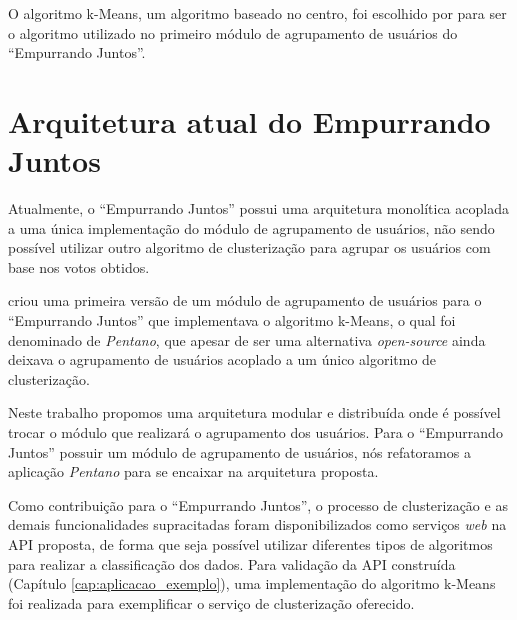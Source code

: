   O algoritmo k-Means, um algoritmo baseado no centro, foi escolhido por  
  para ser o algoritmo utilizado no primeiro módulo de agrupamento de usuários do ``Empurrando Juntos''.
  
\section{Arquitetura atual do Empurrando Juntos}
  
  Atualmente, o ``Empurrando Juntos'' possui uma arquitetura monolítica acoplada a uma única implementação
  do módulo de agrupamento de usuários, não sendo possível utilizar outro algoritmo de clusterização para
  agrupar os usuários com base nos votos obtidos.
  
   criou uma primeira versão de um módulo de agrupamento de usuários
  para o ``Empurrando Juntos'' que implementava o algoritmo k-Means,
  o qual foi denominado de \textit{Pentano}, que apesar de ser uma alternativa \textit{open-source}
  ainda deixava o agrupamento de usuários acoplado a um único algoritmo de clusterização. 
  
  Neste trabalho propomos uma arquitetura modular e distribuída onde é possível
  trocar o módulo que realizará o agrupamento dos usuários.
  Para o ``Empurrando Juntos'' possuir um módulo de agrupamento de usuários, 
  nós refatoramos a aplicação \textit{Pentano} para se encaixar na arquitetura proposta.
  
  Como contribuição para o ``Empurrando Juntos'', o processo de clusterização e as
  demais funcionalidades supracitadas foram disponibilizados como serviços
  \textit{web} na API proposta, de forma que seja possível utilizar diferentes tipos de algoritmos para realizar a classificação dos dados.
  Para validação da API construída (Capítulo \ref{cap:aplicacao_exemplo}), uma implementação do algoritmo k-Means
  foi realizada para exemplificar o serviço de clusterização oferecido.


